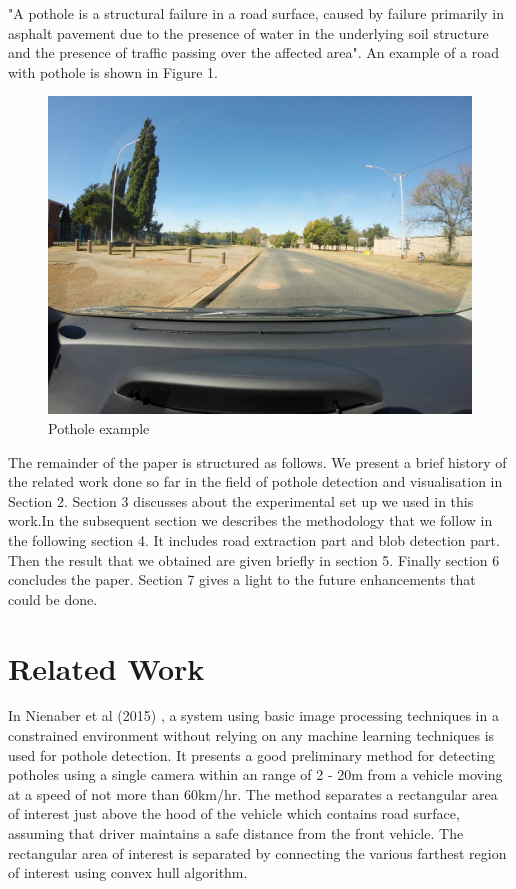 \documentclass[journal]{IEEEtran}
\begin{document}
"A pothole \cite{pothole} is a structural failure in a road surface, caused by failure primarily in asphalt pavement due to the presence of water in the underlying soil structure and the presence of traffic passing over the affected area". An example of a road with pothole is shown in Figure 1.

\begin{figure}[!h]
\begin{center}
\includegraphics[scale=0.065]{Images/pothole_example.JPG}
\end{center}
\caption{Pothole example}
\end{figure}

The remainder of the paper is structured as follows. We present a brief history of the related work done so far in the field of pothole detection and visualisation in Section 2. Section 3 discusses about the experimental set up we used in this work.In the subsequent section we describes the methodology that we follow in the following section 4. It includes road extraction part and blob detection part. Then the result that we obtained are given briefly in section 5. Finally section 6 concludes the paper. Section 7 gives a light to the future enhancements that could be done.


\section{Related Work}
In Nienaber et al (2015) \cite{paperone}, a system using basic image processing techniques in a constrained environment without relying on any machine learning techniques is used for pothole detection. It presents a good preliminary method for detecting potholes using a single camera within an range of 2 - 20m from a vehicle moving at a speed of not more than 60km/hr. The method separates a rectangular area of interest just above the hood of the vehicle which contains road surface, assuming that driver maintains a safe distance from the front vehicle. The rectangular area of interest is separated by connecting the various farthest region of interest using convex hull algorithm.
\end{document}
